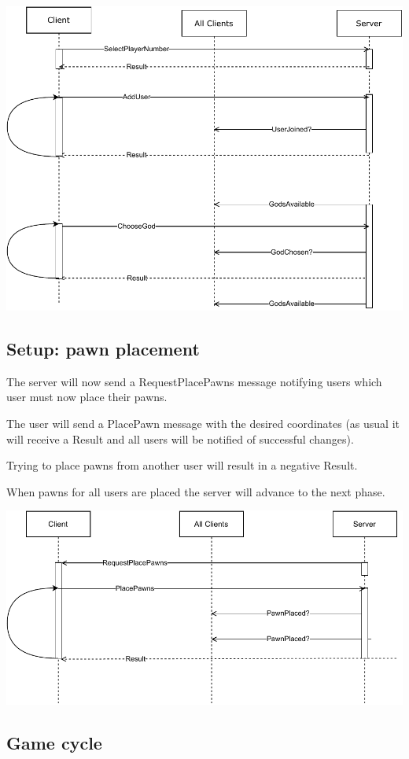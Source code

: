 \documentclass{article}
\begin{document}
\vspace{8pt}
\includegraphics[width=0.85\linewidth]{communication_uml_1.pdf}

\subsection*{Setup: pawn placement}
The server will now send a RequestPlacePawns message notifying users which user must now place their pawns.

The user will send a PlacePawn message with the desired coordinates (as usual it will receive a Result and all users will be notified of successful changes).

Trying to place pawns from another user will result in a negative Result.

When pawns for all users are placed the server will advance to the next phase.

\vspace{8pt}
\includegraphics[width=0.85\linewidth]{communication_uml_2.pdf}
\subsection*{Game cycle}
\end{document}
